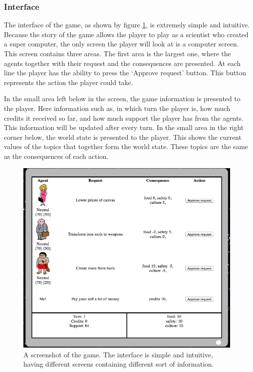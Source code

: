 \documentclass[11pt,a4paper]{article}
\begin{document}
    \subsubsection{Interface}

The interface of the game, as shown by figure \ref{fig:scr}, is extremely simple and intuitive. Because the story of the game allows the player to play as a scientist who created a super computer, the only screen the player will look at is a computer screen. This screen contains three areas. The first area is the largest one, where the agents together with their request and the consequences are presented. At each line the player has the ability to press the `Approve request' button. This button represents the action the player could take. 

In the small area left below in the screen, the game information is presented to the player. Here information such as, in which turn the player is, how much credits it received so far, and how much support the player has from the agents. This information will be updated after every turn. In the small area in the right corner below, the world state is presented to the player. This shows the current values of the topics that together form the world state. These topics are the same as the consequences of each action. 

\begin{figure}[h!]
\centering
\includegraphics[scale=0.5]{screenshot}
\caption{A screenshot of the game. The interface is simple and intuitive, having different screens containing different sort of information. }
\label{fig:scr}
\end{figure}
\end{document}
